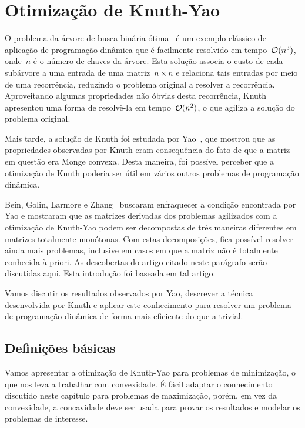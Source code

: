 \chapter{Otimização de Knuth-Yao}
\label{KY}


O problema da árvore de busca binária ótima~\cite{CLRS} é um exemplo clássico de aplicação de programação dinâmica que é facilmente resolvido em tempo~$\mathcal{O}(n^3)$, onde~$n$ é o número de chaves da árvore. Esta solução associa o custo de cada subárvore a uma entrada de uma matriz~${ n \times n }$ e relaciona tais entradas por meio de uma recorrência, reduzindo o problema original a resolver a recorrência. Aproveitando algumas propriedades não óbvias desta recorrência, Knuth~\cite{Knuth:1971} apresentou uma forma de resolvê-la em tempo~$\mathcal{O}(n^2)$, o que agiliza a solução do problema original.

Mais tarde, a solução de Knuth foi estudada por Yao~\cite{Yao:1980,Yao:1982}, que mostrou que as propriedades observadas por Knuth eram consequência do fato de que a matriz em questão era Monge convexa. Desta maneira, foi possível perceber que a otimização de Knuth poderia ser útil em vários outros problemas de programação dinâmica. 

Bein, Golin, Larmore e Zhang~\cite{Bein:2009} buscaram enfraquecer a condição encontrada por Yao e mostraram que as matrizes derivadas dos problemas agilizados com a otimização de Knuth-Yao podem ser decompostas de três maneiras diferentes em matrizes totalmente monótonas. Com estas decomposições, fica possível resolver ainda mais problemas, inclusive em casos em que a matriz não é totalmente conhecida à priori. As descobertas do artigo citado neste parágrafo serão discutidas aqui. Esta introdução foi baseada em tal artigo.

Vamos discutir os resultados observados por Yao, descrever a técnica desenvolvida por Knuth e aplicar este conhecimento para resolver um problema de programação dinâmica de forma mais eficiente do que a trivial.


\section{Definições básicas} \label{KY:defs}

Vamos apresentar a otimização de Knuth-Yao para problemas de minimização, o que nos leva a trabalhar com convexidade. É fácil adaptar o conhecimento discutido neste capítulo para problemas de maximização, porém, em vez da convexidade, a concavidade deve ser usada para provar os resultados e modelar os problemas de interesse.

